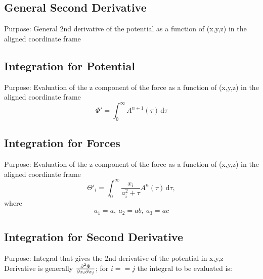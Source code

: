 \documentclass[a4paper,11pt]{article}
\begin{document}
		\subsection{General Second Derivative}
			Purpose: General 2nd derivative of the potential as a function of (x,y,z) in the aligned coordinate frame \\
			
	
	
		\subsection{Integration for Potential}
			Purpose: Evaluation of the z component of the force as a function of (x,y,z) in the aligned coordinate frame \\
		\begin{equation}
		\Phi' = \int_{0}^{\infty} A^{n+1}(\tau)\,\mathrm{d} \tau
		\end{equation}
			
	
	
		\subsection{Integration for Forces}
			Purpose: Evaluation of the z component of the force as a function of (x,y,z) in the aligned coordinate frame \\
		\begin{equation}
		\Theta'_i = \int_0^{\infty} \frac{x_i}{a_i^2 + \tau} A^{n}(\tau)\,\mathrm{d} \tau,
		\end{equation}
		where
		\begin{equation}
		a_1 = a,~ a_2 = ab,~a_3 = ac
		\end{equation}
		
			
	
		
		\subsection{Integration for Second Derivative}
			Purpose: Integral that gives the 2nd derivative of the potential in x,y,z \\
			Derivative is generally $ \pdv{\Phi}{x_i}{x_j} $; for $ i==j $ the integral to be evaluated is: 
			
\end{document}
